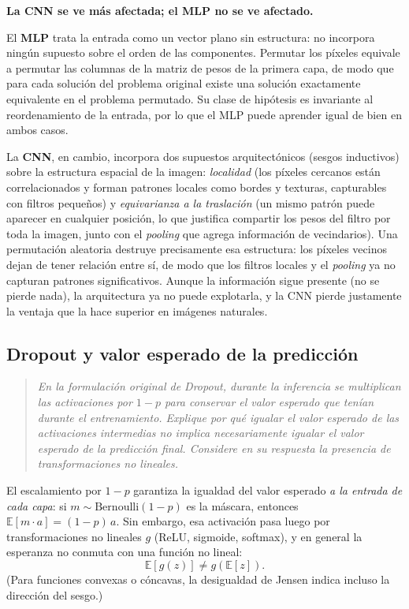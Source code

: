 \documentclass[12pt, a4paper]{article}
\newenvironment{enunciado}
  {\begin{quote}\itshape\color{black!75}}
  {\end{quote}}
\begin{document}
\textbf{La CNN se ve más afectada; el MLP no se ve afectado.}

El \textbf{MLP} trata la entrada como un vector plano sin estructura: no incorpora ningún
supuesto sobre el orden de las componentes. Permutar los píxeles equivale a permutar las
columnas de la matriz de pesos de la primera capa, de modo que para cada solución del
problema original existe una solución exactamente equivalente en el problema permutado.
Su clase de hipótesis es invariante al reordenamiento de la entrada, por lo que el MLP
puede aprender igual de bien en ambos casos.

La \textbf{CNN}, en cambio, incorpora dos supuestos arquitectónicos (sesgos inductivos)
sobre la estructura espacial de la imagen: \emph{localidad} (los píxeles cercanos están
correlacionados y forman patrones locales como bordes y texturas, capturables con filtros
pequeños) y \emph{equivarianza a la traslación} (un mismo patrón puede aparecer en cualquier
posición, lo que justifica compartir los pesos del filtro por toda la imagen, junto con el
\emph{pooling} que agrega información de vecindarios). Una permutación aleatoria destruye
precisamente esa estructura: los píxeles vecinos dejan de tener relación entre sí, de modo
que los filtros locales y el \emph{pooling} ya no capturan patrones significativos. Aunque
la información sigue presente (no se pierde nada), la arquitectura ya no puede explotarla,
y la CNN pierde justamente la ventaja que la hace superior en imágenes naturales.

\subsection{Dropout y valor esperado de la predicción}

\begin{enunciado}
En la formulación original de Dropout, durante la inferencia se multiplican las activaciones
por $1-p$ para conservar el valor esperado que tenían durante el entrenamiento. Explique por
qué igualar el valor esperado de las activaciones intermedias no implica necesariamente
igualar el valor esperado de la predicción final. Considere en su respuesta la presencia de
transformaciones no lineales.
\end{enunciado}

El escalamiento por $1-p$ garantiza la igualdad del valor esperado \emph{a la entrada de
cada capa}: si $m \sim \mathrm{Bernoulli}(1-p)$ es la máscara, entonces
$\mathbb{E}[m \cdot a] = (1-p)\,a$. Sin embargo, esa activación pasa luego por
transformaciones no lineales $g$ (ReLU, sigmoide, softmax), y en general la esperanza no
conmuta con una función no lineal:
\begin{equation}
\mathbb{E}[g(z)] \neq g(\mathbb{E}[z]).
\end{equation}
(Para funciones convexas o cóncavas, la desigualdad de Jensen indica incluso la dirección
del sesgo.)
\end{document}
